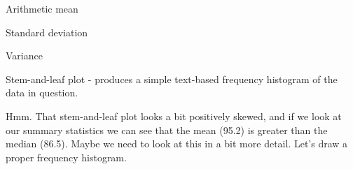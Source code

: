 \documentclass[
]{book}
\newenvironment{Shaded}{\begin{snugshade}}{\end{snugshade}}
\newcommand{\DataTypeTok}[1]{\textcolor[rgb]{0.13,0.29,0.53}{#1}}
\newcommand{\DecValTok}[1]{\textcolor[rgb]{0.00,0.00,0.81}{#1}}
\newcommand{\FloatTok}[1]{\textcolor[rgb]{0.00,0.00,0.81}{#1}}
\newcommand{\KeywordTok}[1]{\textcolor[rgb]{0.13,0.29,0.53}{\textbf{#1}}}
\newcommand{\NormalTok}[1]{#1}
\newcommand{\OperatorTok}[1]{\textcolor[rgb]{0.81,0.36,0.00}{\textbf{#1}}}
\newcommand{\StringTok}[1]{\textcolor[rgb]{0.31,0.60,0.02}{#1}}
\begin{document}
Arithmetic mean

\begin{Shaded}
\end{Shaded}

Standard deviation

\begin{Shaded}
\end{Shaded}

Variance

Stem-and-leaf plot - produces a simple text-based frequency histogram of the data in question.

\begin{Shaded}
\end{Shaded}

Hmm. That stem-and-leaf plot looks a bit positively skewed, and if we look at our summary statistics we can see that the mean (95.2) is greater than the median (86.5). Maybe we need to look at this in a bit more detail. Let's draw a proper frequency histogram.

\begin{Shaded}
\end{Shaded}
\end{document}
